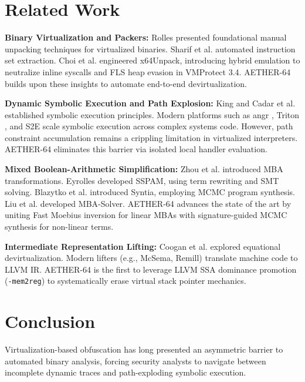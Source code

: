 \documentclass[11pt,a4paper]{article}
\begin{document}
\section{Related Work}
\textbf{Binary Virtualization and Packers:} Rolles \cite{rolles2009} presented foundational manual unpacking techniques for virtualized binaries. Sharif et al. \cite{sharif2009} automated instruction set extraction. Choi et al. \cite{x64unpack} engineered x64Unpack, introducing hybrid emulation to neutralize inline syscalls and FLS heap evasion in VMProtect 3.4. AETHER-64 builds upon these insights to automate end-to-end devirtualization.

\textbf{Dynamic Symbolic Execution and Path Explosion:} King \cite{king1976} and Cadar et al. \cite{klee} established symbolic execution principles. Modern platforms such as angr \cite{angr}, Triton \cite{triton}, and S2E \cite{angr} scale symbolic execution across complex systems code. However, path constraint accumulation remains a crippling limitation in virtualized interpreters. AETHER-64 eliminates this barrier via isolated local handler evaluation.

\textbf{Mixed Boolean-Arithmetic Simplification:} Zhou et al. \cite{zhou2007} introduced MBA transformations. Eyrolles \cite{eyrolles2017} developed SSPAM, using term rewriting and SMT solving. Blazytko et al. \cite{syntia} introduced Syntia, employing MCMC program synthesis. Liu et al. \cite{mbasolver} developed MBA-Solver. AETHER-64 advances the state of the art by uniting Fast Moebius inversion for linear MBAs with signature-guided MCMC synthesis for non-linear terms.

\textbf{Intermediate Representation Lifting:} Coogan et al. \cite{coogan2011} explored equational devirtualization. Modern lifters (e.g., McSema, Remill) translate machine code to LLVM IR. AETHER-64 is the first to leverage LLVM SSA dominance promotion (\texttt{-mem2reg}) to systematically erase virtual stack pointer mechanics.

\section{Conclusion}
Virtualization-based obfuscation has long presented an asymmetric barrier to automated binary analysis, forcing security analysts to navigate between incomplete dynamic traces and path-exploding symbolic execution.
\end{document}
